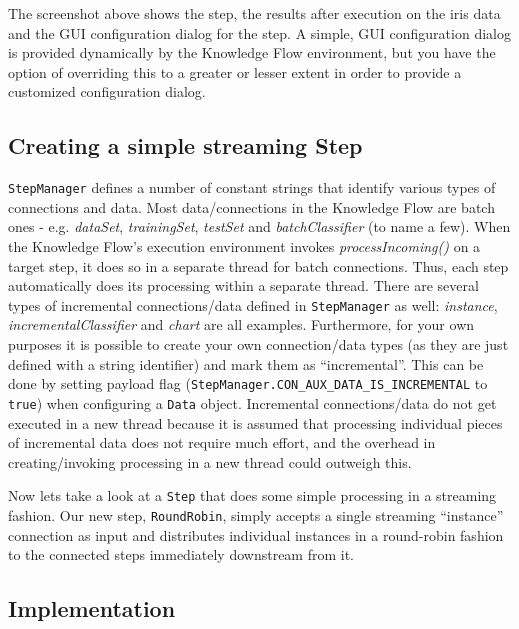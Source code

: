 The screenshot above shows the step, the results after execution on
the iris data and the GUI configuration dialog for the step. A simple,
GUI configuration dialog is provided dynamically by the Knowledge Flow
environment, but you have the option of overriding this to a greater
or lesser extent in order to provide a customized configuration
dialog.

\subsection{Creating a simple streaming Step}
\verb=StepManager= defines a number of constant strings that identify
various types of connections and data. Most data/connections in the
Knowledge Flow are batch ones - e.g. \textit{dataSet},
\textit{trainingSet}, \textit{testSet} and \textit{batchClassifier}
(to name a few). When the Knowledge Flow's execution environment
invokes \textit{processIncoming()} on a target step, it does so in a
separate thread for batch connections. Thus, each step automatically
does its processing within a separate thread. There are several types
of incremental connections/data defined in \verb=StepManager= as well:
\textit{instance}, \textit{incrementalClassifier} and \textit{chart}
are all examples. Furthermore, for your own purposes it is possible to
create your own connection/data types (as they are just defined with a
string identifier) and mark them as ``incremental''. This can be done
by setting payload flag
(\verb=StepManager.CON_AUX_DATA_IS_INCREMENTAL= to \verb=true=) when
configuring a \verb=Data= object. Incremental connections/data do not
get executed in a new thread because it is assumed that processing
individual pieces of incremental data does not require much effort,
and the overhead in creating/invoking processing in a new thread could
outweigh this.

Now lets take a look at a \verb=Step= that does some simple processing
in a streaming fashion. Our new step, \verb=RoundRobin=, simply
accepts a single streaming ``instance'' connection as input and
distributes individual instances in a round-robin fashion to the
connected steps immediately downstream from it.

\subsection*{Implementation}

